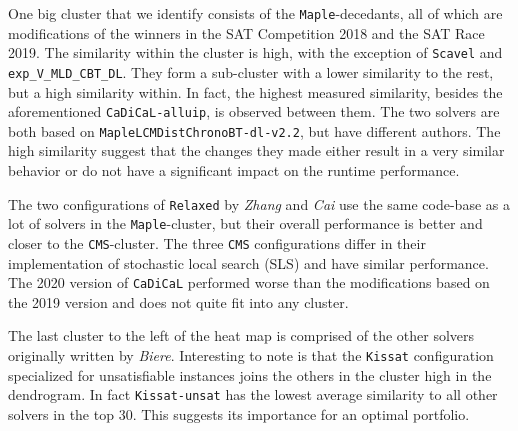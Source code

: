 \documentclass{elsarticle}
\newcommand{\solver}[1]{\texttt{#1}}
\begin{document}
One big cluster that we identify consists of the \solver{Maple}-decedants, 
all of which are modifications of the winners in the SAT Competition 2018 and
the SAT Race 2019.
The similarity within the cluster is high, with the exception of
\solver{Scavel} and \solver{exp\_V\_MLD\_CBT\_DL}.
They form a sub-cluster
with a lower similarity to the rest, but a high similarity within. In fact, the highest measured similarity,
besides the aforementioned \solver{CaDiCaL-alluip}, is observed between them.
The two solvers are both based on
\solver{MapleLCMDistChronoBT-dl-v2.2}, but have different authors.
The high similarity suggest that the
changes they made either result in a very similar behavior or do not have a
significant impact on the runtime performance.

The two configurations of \solver{Relaxed} by \emph{Zhang} and \emph{Cai}
use the same code-base as a lot of solvers in the \solver{Maple}-cluster, but their
overall performance is better and closer to the \solver{CMS}-cluster.
The three \solver{CMS} configurations
differ in their implementation of stochastic local search
(SLS) and have similar performance.
The 2020 version of \solver{CaDiCaL}
performed worse than the modifications based on the 2019 version and
does not quite fit into any cluster.

The last cluster to the left of the heat map is comprised of the other solvers
originally written by \emph{Biere}. Interesting to note is that the
\solver{Kissat} configuration specialized for unsatisfiable instances joins the
others in the cluster high in the dendrogram. In fact \solver{Kissat-unsat} has
the lowest average similarity to all other solvers in the top 30.
This suggests its importance for an optimal
portfolio.

\end{document}
